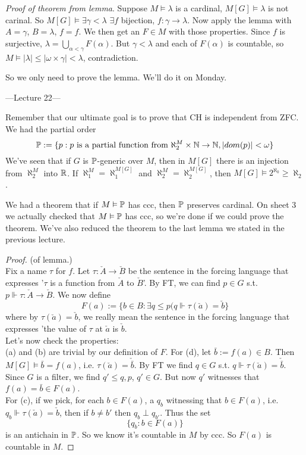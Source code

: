 \documentclass[a4paper]{article}
\begin{document}
\emph{Proof of theorem from lemma}. Suppose $M \vDash \lambda$ is a cardinal, $M[G] \vDash \lambda$ is not carinal. So $M[G] \vDash \exists \gamma < \lambda$ $\exists f$ bijection, $f:\gamma \to \lambda$. Now apply the lemma with $A = \gamma$, $B = \lambda$, $f=f$. We then get an $F \in M$ with those properties. Since $f$ is surjective, $\lambda = \bigcup_{\alpha < \gamma} F(\alpha)$. But $\gamma < \lambda$ and each of $F(\alpha)$ is countable, so $M \vDash |\lambda| \leq |\omega \times \gamma| < \lambda$, contradiction.

So we only need to prove the lemma. We'll do it on Monday.

---Lecture 22---

Remember that our ultimate goal is to prove that CH is independent from ZFC. We had the partial order
\[
\P:=\{p: p\text{ is a partial function from }\aleph_2^M \times\N \to \N, |dom(p)| < \omega\}
\]
We've seen that if $G$ is $\P$-generic over $M$, then in $M[G]$ there is an injection from $\aleph_2^M$ into $\R$. If $\aleph_1^M = \aleph_1^{M[G]}$ and $\aleph_2^M = \aleph_2^{M[G]}$, then $M[G] \vDash 2^{\aleph_0} \geq \aleph_2$.

We had a theorem that if $M \vDash \P$ has ccc, then $\P$ preserves cardinal. On sheet 3 we actually checked that $M \vDash\P$ has ccc, so we're done if we could prove the theorem. We've also reduced the theorem to the last lemma we stated in the previous lecture.

\begin{proof} (of lemma.)\\
Fix a name $\tau$ for $f$. Let $\tau: \check{A} \to \check{B}$ be the sentence in the forcing language that expresses '$\tau$ is a function from $\check{A}$ to $\check{B}$'. By FT, we can find $p \in G$ s.t. $p \Vdash \tau:\check{A} \to \check{B}$. We now define 
\[
F(a) := \{b \in B: \exists q \leq p(q \Vdash \tau(\check{a}) = \check{b}\}
\]
where by $\tau(\check{a}) = \check{b}$, we really mean the sentence in the forcing language that expresses 'the value of $\tau$ at $\check{a}$ is $\check{b}$.\\
Let's now check the properties:\\
(a) and (b) are trivial by our definition of $F$. For (d), let $\bar{b} := f(a) \in B$. Then $M[G] \vDash \bar{b} = f(a)$, i.e. $\tau(\check{a}) = \check{\bar{b}}$. By FT we find $q \in G$ s.t. $q \Vdash \tau(\check{a}) = \check{\bar{b}}$. Since $G$ is a filter, we find $q' \leq q,p$, $q' \in G$. But now $q'$ witnesses that $f(a) = \bar{b} \in F(a)$.\\
For (c), if we pick, for each $b \in F(a)$, a $q_b$ witnessing that $b \in F(a)$, i.e. $q_b \Vdash \tau(\check{a}) = \check{b}$, then if $b \neq b'$ then $q_b \perp q_{b'}$. Thus the set
\[
\{q_b: b \in F(a)\}
\]
is an antichain in $\P$. So we know it's countable in $M$ by ccc. So $F(a)$ is countable in $M$.
\end{proof}
\end{document}
